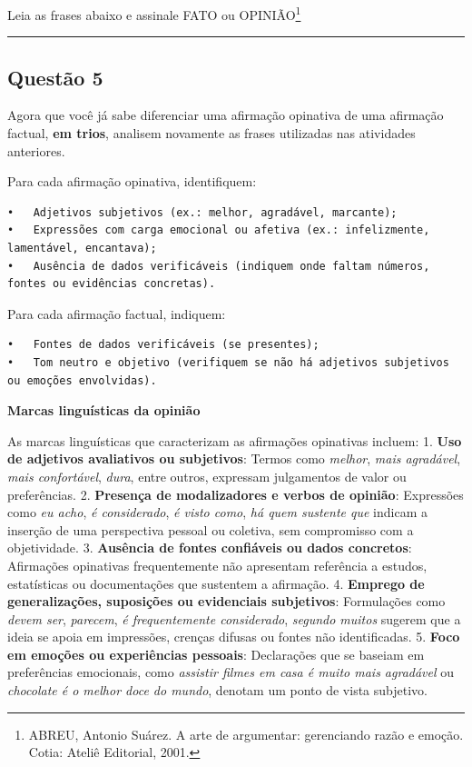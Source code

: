 \documentclass[
]{book}
\begin{document}
Leia as frases abaixo e assinale FATO ou OPINIÃO\footnote{ABREU, Antonio Suárez. A arte de argumentar: gerenciando razão e emoção. Cotia: Ateliê Editorial,
  2001.}

\begin{center}\rule{0.5\linewidth}{0.5pt}\end{center}

\subsection{Questão 5}\label{questuxe3o-5-1}

Agora que você já sabe diferenciar uma afirmação opinativa de uma afirmação factual, \textbf{em trios}, analisem novamente as frases utilizadas nas atividades anteriores.

Para cada afirmação opinativa, identifiquem:

\begin{verbatim}
•   Adjetivos subjetivos (ex.: melhor, agradável, marcante);
•   Expressões com carga emocional ou afetiva (ex.: infelizmente, lamentável, encantava);
•   Ausência de dados verificáveis (indiquem onde faltam números, fontes ou evidências concretas).
\end{verbatim}

Para cada afirmação factual, indiquem:

\begin{verbatim}
•   Fontes de dados verificáveis (se presentes);
•   Tom neutro e objetivo (verifiquem se não há adjetivos subjetivos ou emoções envolvidas).
\end{verbatim}

\textbf{Marcas linguísticas da opinião}

As marcas linguísticas que caracterizam as afirmações opinativas incluem:
1. \textbf{Uso de adjetivos avaliativos ou subjetivos}: Termos como \emph{melhor}, \emph{mais agradável}, \emph{mais confortável}, \emph{dura}, entre outros, expressam julgamentos de valor ou preferências.
2. \textbf{Presença de modalizadores e verbos de opinião}: Expressões como \emph{eu acho}, \emph{é considerado}, \emph{é visto como}, \emph{há quem sustente que} indicam a inserção de uma perspectiva pessoal ou coletiva, sem compromisso com a objetividade.
3. \textbf{Ausência de fontes confiáveis ou dados concretos}: Afirmações opinativas frequentemente não apresentam referência a estudos, estatísticas ou documentações que sustentem a afirmação.
4. \textbf{Emprego de generalizações, suposições ou evidenciais subjetivos}: Formulações como \emph{devem ser}, \emph{parecem}, \emph{é frequentemente considerado}, \emph{segundo muitos} sugerem que a ideia se apoia em impressões, crenças difusas ou fontes não identificadas.
5. \textbf{Foco em emoções ou experiências pessoais}: Declarações que se baseiam em preferências emocionais, como \emph{assistir filmes em casa é muito mais agradável} ou \emph{chocolate é o melhor doce do mundo}, denotam um ponto de vista subjetivo.
\end{document}
